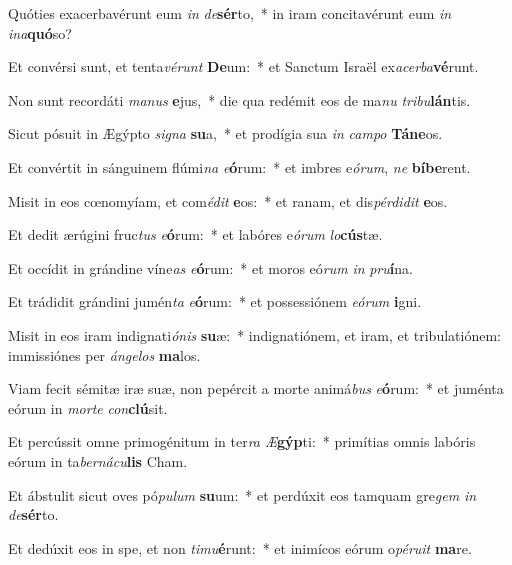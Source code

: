\item Quóties exacerbavérunt eum \textit{in} \textit{de}\textbf{sér}to,~* in iram concitavérunt eum \textit{in} \textit{in}\textit{a}\textbf{quó}so?
\item Et convérsi sunt, et tenta\textit{vé}\textit{runt} \textbf{De}um:~* et Sanctum Israël ex\textit{a}\textit{cer}\textit{ba}\textbf{vé}runt.
\item Non sunt recordáti \textit{ma}\textit{nus} \textbf{e}jus,~* die qua redémit eos de ma\textit{nu} \textit{tri}\textit{bu}\textbf{lán}tis.
\item Sicut pósuit in Ægýpto \textit{si}\textit{gna} \textbf{su}a,~* et prodígia sua \textit{in} \textit{cam}\textit{po} \textbf{Tá}\textbf{ne}os.
\item Et convértit in sánguinem flúmi\textit{na} \textit{e}\textbf{ó}rum:~* et imbres e\textit{ó}\textit{rum}, \textit{ne} \textbf{bí}\textbf{be}rent.
\item Misit in eos cœnomyíam, et com\textit{é}\textit{dit} \textbf{e}os:~* et ranam, et dis\textit{pér}\textit{di}\textit{dit} \textbf{e}os.
\item Et dedit ærúgini fruc\textit{tus} \textit{e}\textbf{ó}rum:~* et labóres e\textit{ó}\textit{rum} \textit{lo}\textbf{cús}tæ.
\item Et occídit in grándine víne\textit{as} \textit{e}\textbf{ó}rum:~* et moros eó\textit{rum} \textit{in} \textit{pru}\textbf{í}na.
\item Et trádidit grándini jumén\textit{ta} \textit{e}\textbf{ó}rum:~* et possessiónem \textit{e}\textit{ó}\textit{rum} \textbf{i}gni.
\item Misit in eos iram indignati\textit{ó}\textit{nis} \textbf{su}æ:~* indignatiónem, et iram, et tribulatiónem: immissiónes per \textit{án}\textit{ge}\textit{los} \textbf{ma}los.
\item Viam fecit sémitæ iræ suæ, non pepércit a morte animá\textit{bus} \textit{e}\textbf{ó}rum:~* et juménta eórum in \textit{mor}\textit{te} \textit{con}\textbf{clú}sit.
\item Et percússit omne primogénitum in ter\textit{ra} \textit{Æ}\textbf{gýp}ti:~* primítias omnis labóris eórum in ta\textit{ber}\textit{ná}\textit{cu}\textbf{lis} Cham.
\item Et ábstulit sicut oves pó\textit{pu}\textit{lum} \textbf{su}um:~* et perdúxit eos tamquam gre\textit{gem} \textit{in} \textit{de}\textbf{sér}to.
\item Et dedúxit eos in spe, et non \textit{ti}\textit{mu}\textbf{é}runt:~* et inimícos eórum o\textit{pé}\textit{ru}\textit{it} \textbf{ma}re.

